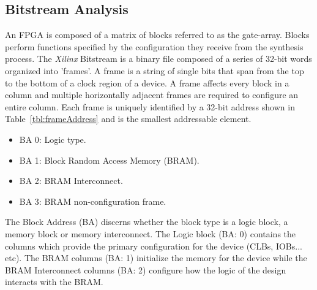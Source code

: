 \documentclass[journal, hidelinks]{IEEEtran}
\begin{document}
\subsection{Bitstream Analysis} \label{sec:bitstreamComposition}

An FPGA is composed of a matrix of blocks referred to as the gate-array.
Blocks perform functions specified by the configuration they receive from the synthesis process.
The \textit{Xilinx} Bitstream is a binary file composed of a series of 32-bit words organized into 'frames'.
A frame is a string of single bits that span from the top to the bottom of a clock region of a device.
A frame affects every block in a column and multiple horizontally adjacent frames are required to configure an entire column.
Each frame is uniquely identified by a 32-bit address shown in Table~\ref{tbl:frameAddress} and is the smallest addressable element.


\begin{itemize}
	\item BA 0: Logic type.
	\item BA 1: Block Random Access Memory (BRAM).
	\item BA 2: BRAM Interconnect.
	\item BA 3: BRAM non-configuration frame.
\end{itemize}

The Block Address (BA) discerns whether the block type is a logic block, a memory block or memory interconnect.
The Logic block (BA: 0) contains the columns which provide the primary configuration for the device (CLBs, IOBs... etc).
The BRAM columns (BA: 1) initialize the memory for the device while the BRAM Interconnect columns (BA: 2) configure how the logic of the design interacts with the BRAM.
\end{document}
